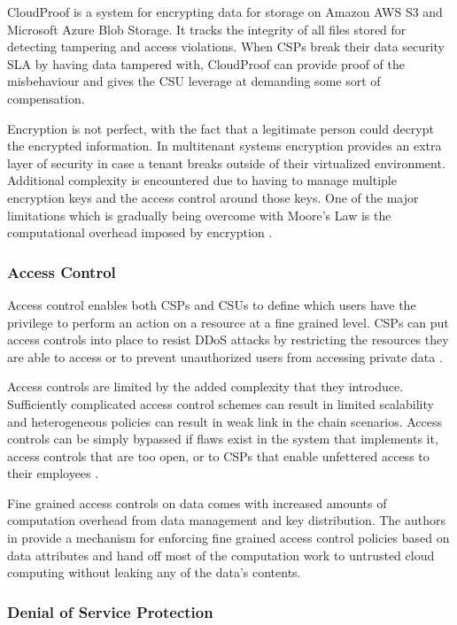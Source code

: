 \documentclass[12pt]{article}
\begin{document}
CloudProof \cite{popa2011enabling} is a system for encrypting data for storage on Amazon AWS S3 and Microsoft Azure Blob Storage. It tracks the integrity of all files stored for detecting tampering and access violations. When CSPs break their data security SLA by having data tampered with, CloudProof can provide proof of the misbehaviour and gives the CSU leverage at demanding some sort of compensation.

Encryption is not perfect, with the fact that a legitimate person could decrypt the encrypted information. In multitenant systems encryption provides an extra layer of security in case a tenant breaks outside of their virtualized environment. Additional complexity is encountered due to having to manage multiple encryption keys and the access control around those keys. One of the major limitations which is gradually being overcome with Moore's Law is the computational overhead imposed by encryption \cite{liu2015survey}.

\subsubsection{Access Control}

Access control enables both CSPs and CSUs to define which users have the privilege to perform an action on a resource at a fine grained level. CSPs can put access controls into place to resist DDoS attacks by restricting the resources they are able to access or to prevent unauthorized users from accessing private data \cite{liu2015survey}.

Access controls are limited by the added complexity that they introduce. Sufficiently complicated access control schemes can result in limited scalability and heterogeneous policies can result in weak link in the chain scenarios. Access controls can be simply bypassed if flaws exist in the system that implements it, access controls that are too open, or to CSPs that enable unfettered access to their employees \cite{kazim2015survey}.

Fine grained access controls on data comes with increased amounts of computation overhead from data management and key distribution. The authors in \cite{yu2010achieving} provide a mechanism for enforcing fine grained access control policies based on data attributes and hand off most of the computation work to untrusted cloud computing without leaking any of the data's contents.



\subsubsection{Denial of Service Protection}
\end{document}
